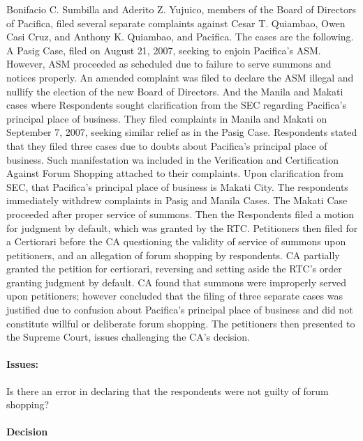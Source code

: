 \documentclass[
12pt,
oneside,
onehalfspacing,
headsepline
]{DigestCollection}
\begin{document}
Bonifacio C. Sumbilla and Aderito Z. Yujuico, members of the Board of Directors of Pacifica, filed several separate complaints against Cesar T. Quiambao, Owen Casi Cruz, and Anthony K. Quiambao, and Pacifica. The cases are the following. A Pasig Case, filed on August 21, 2007, seeking to enjoin Pacifica's ASM. However, ASM proceeded as scheduled due to failure to serve summons and notices properly. An amended complaint was filed to declare the ASM illegal and nullify the election of the new Board of Directors. And the Manila and Makati cases where Respondents sought clarification from the SEC regarding Pacifica's principal place of business. They filed complaints in Manila and Makati on September 7, 2007, seeking similar relief as in the Pasig Case. Respondents stated that they filed three cases due to doubts about Pacifica's principal place of business. Such manifestation wa included in the Verification and Certification Against Forum Shopping attached to their complaints. Upon clarification from SEC, that Pacifica's principal place of business is Makati City. The respondents immediately withdrew complaints in Pasig and Manila Cases. The Makati Case proceeded after proper service of summons. Then the Respondents filed a motion for judgment by default, which was granted by the RTC. Petitioners then filed for a Certiorari before the CA questioning the validity of service of summons upon petitioners, and an allegation of forum shopping by respondents. CA partially granted the petition for certiorari, reversing and setting aside the RTC's order granting judgment by default. CA found that summons were improperly served upon petitioners; however concluded that the filing of three separate cases was justified due to confusion about Pacifica's principal place of business and did not constitute willful or deliberate forum shopping. The petitioners then presented to the Supreme Court, issues challenging the CA's decision.

\paragraph{Issues: }
\label{a30c4180-09fd-11ef-932c-63c852f65e48}


Is there an error in declaring that the respondents were not guilty of forum shopping?

\paragraph{Decision }
\label{a4854cf0-09fd-11ef-932c-63c852f65e48}
\end{document}
